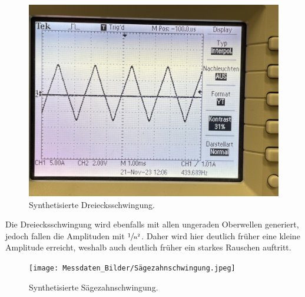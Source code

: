 \begin{figure}[H]
  \centering
  \includegraphics[scale=0.06]{Messdaten_Bilder/Dreiecksschwingung.jpeg}
  \caption{Synthetisierte Dreiecksschwingung.}
  \label{fig:Dreiecksschwingung}
\end{figure}\noindent
Die Dreiecksschwingung wird ebenfalls mit allen ungeraden Oberwellen generiert, jedoch fallen die Amplituden mit $\sfrac{1}{n^2}$.
Daher wird hier deutlich früher eine kleine Amplitude erreicht, weshalb auch deutlich früher ein starkes Rauschen auftritt. 
\begin{figure}[H]
  \centering
  \texttt{[image: Messdaten\_Bilder/Sägezahnschwingung.jpeg]}
  \caption{Synthetisierte Sägezahnschwingung.}
  \label{fig:Sägezahnschwingung}
\end{figure}
